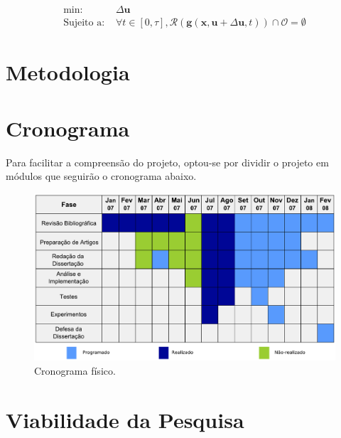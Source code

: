 \documentclass[a4paper, 12pt]{article}
\begin{document}
\begin{equation}
\begin{aligned}
\text{min: }& \Delta\mathbf{u} \\
\text{Sujeito a: }& \forall t \in [0,\tau], \mathcal{R}(\mathbf{g}(\mathbf{x}, \mathbf{u}+\Delta\mathbf{u}, t)) \cap \mathcal{O} = \emptyset
\end{aligned}
\label{eq:equacaoProb}
\end{equation}



\newpage

\section{Metodologia}
\label{sec:meto}

\newpage

\section{Cronograma} 
\label{sec:crono}
Para facilitar a compreensão do projeto, optou-se por dividir o projeto em módulos que seguirão o cronograma abaixo.
\begin{figure}[h]
	\centering
		\includegraphics[scale=0.4]{img/cronograma.pdf}
	\caption{Cronograma físico.}
	\label{fig:cronograma}
\end{figure}

\newpage

\section{Viabilidade da Pesquisa}
\label{sec:viabilidade}
\end{document}
